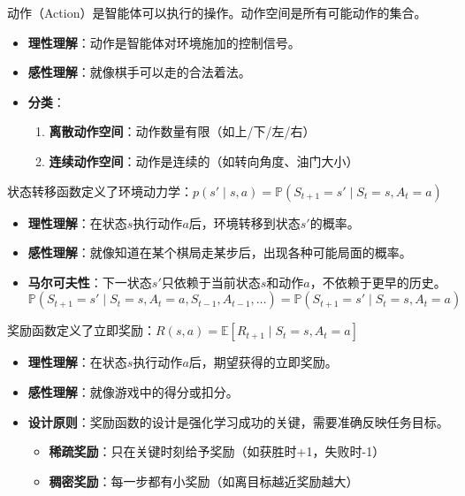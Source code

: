 \begin{definition}
动作（Action）是智能体可以执行的操作。动作空间是所有可能动作的集合。
\begin{itemize}
    \item \textbf{理性理解}：动作是智能体对环境施加的控制信号。
    \item \textbf{感性理解}：就像棋手可以走的合法着法。
    \item \textbf{分类}：
    \begin{enumerate}
        \item \textbf{离散动作空间}：动作数量有限（如上/下/左/右）
        \item \textbf{连续动作空间}：动作是连续的（如转向角度、油门大小）
    \end{enumerate}
\end{itemize}
\end{definition}

\begin{definition}[状态转移函数 $P$]
状态转移函数定义了环境动力学：$p(s' \mid s, a) = \mathbb{P}(S_{t+1} = s' \mid S_t = s, A_t = a)$
\begin{itemize}
    \item \textbf{理性理解}：在状态$s$执行动作$a$后，环境转移到状态$s'$的概率。
    \item \textbf{感性理解}：就像知道在某个棋局走某步后，出现各种可能局面的概率。
    \item \textbf{马尔可夫性}：下一状态$s'$只依赖于当前状态$s$和动作$a$，不依赖于更早的历史。
    \[
    \mathbb{P}(S_{t+1} = s' \mid S_t = s, A_t = a, S_{t-1}, A_{t-1}, \ldots) = \mathbb{P}(S_{t+1} = s' \mid S_t = s, A_t = a)
    \]
\end{itemize}
\end{definition}

\begin{definition}[奖励函数 $R$]
奖励函数定义了立即奖励：$R(s, a) = \mathbb{E}[R_{t+1} \mid S_t = s, A_t = a]$
\begin{itemize}
    \item \textbf{理性理解}：在状态$s$执行动作$a$后，期望获得的立即奖励。
    \item \textbf{感性理解}：就像游戏中的得分或扣分。
    \item \textbf{设计原则}：奖励函数的设计是强化学习成功的关键，需要准确反映任务目标。
    \begin{itemize}
        \item \textbf{稀疏奖励}：只在关键时刻给予奖励（如获胜时+1，失败时-1）
        \item \textbf{稠密奖励}：每一步都有小奖励（如离目标越近奖励越大）
    \end{itemize}
\end{itemize}
\end{definition}

